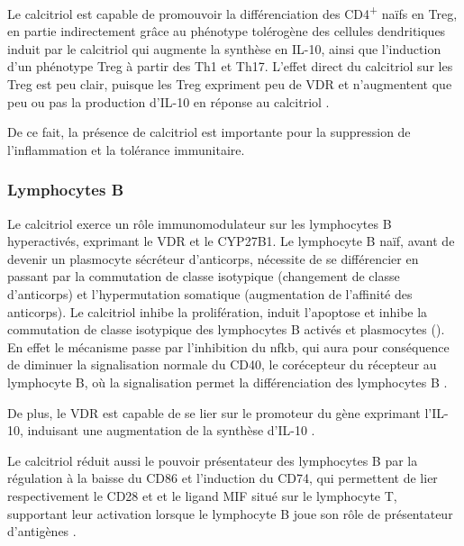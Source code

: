 \documentclass[
  a4paper,
  DIV=11,
  numbers=noendperiod,
  listof=totoc]{scrreprt}
\begin{document}
Le calcitriol est capable de promouvoir la différenciation des
CD4\textsuperscript{+} naïfs en \ac{Treg}, en partie indirectement grâce
au phénotype tolérogène des cellules dendritiques induit par le
calcitriol qui augmente la synthèse en IL-10, ainsi que l'induction d'un
phénotype \ac{Treg} à partir des Th1 et Th17. L'effet direct du
calcitriol sur les \ac{Treg} est peu clair, puisque les \ac{Treg}
expriment peu de \ac{VDR} et n'augmentent que peu ou pas la production
d'IL-10 en réponse au calcitriol \autocite{Bishop.2021}.

De ce fait, la présence de calcitriol est importante pour la suppression
de l'inflammation et la tolérance immunitaire.

\subsubsection{Lymphocytes B}\label{lymphocytes-b}

Le calcitriol exerce un rôle immunomodulateur sur les lymphocytes B
hyperactivés, exprimant le \ac{VDR} et le \ac{CYP27B1}. Le lymphocyte B
naïf, avant de devenir un plasmocyte sécréteur d'anticorps, nécessite de
se différencier en passant par la commutation de classe isotypique
(changement de classe d'anticorps) et l'hypermutation somatique
(augmentation de l'affinité des anticorps). Le calcitriol inhibe la
prolifération, induit l'apoptose et inhibe la commutation de classe
isotypique des lymphocytes B activés et plasmocytes
(). En effet le mécanisme passe par l'inhibition du
\ac{nfkb}, qui aura pour conséquence de diminuer la signalisation
normale du CD40, le corécepteur du récepteur au lymphocyte B, où la
signalisation permet la différenciation des lymphocytes B
\autocite{Dankers.2017,Meza-Meza.2022}.

De plus, le \ac{VDR} est capable de se lier sur le promoteur du gène
exprimant l'IL-10, induisant une augmentation de la synthèse d'IL-10
\autocite{Dankers.2017,Martens.2020,Meza-Meza.2022}.

Le calcitriol réduit aussi le pouvoir présentateur des lymphocytes B par
la régulation à la baisse du CD86 et l'induction du CD74, qui permettent
de lier respectivement le CD28 et et le ligand \ac{MIF} situé sur le
lymphocyte T, supportant leur activation lorsque le lymphocyte B joue
son rôle de présentateur d'antigènes
\autocite{Dankers.2017,Martens.2020}.
\end{document}
